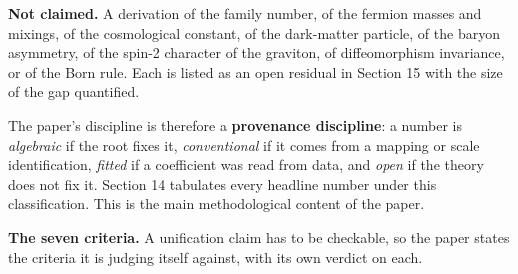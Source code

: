 \documentclass[aps,prd,twocolumn,amsmath,amssymb,superscriptaddress,nofootinbib,floatfix]{revtex4-2}
\begin{document}
\textbf{Not claimed.} A derivation of the family number, of the fermion
masses and mixings, of the cosmological constant, of the dark-matter
particle, of the baryon asymmetry, of the spin-2 character of the
graviton, of diffeomorphism invariance, or of the Born rule. Each is
listed as an open residual in Section 15 with the size of the gap
quantified.

The paper's discipline is therefore a \textbf{provenance discipline}: a
number is \emph{algebraic} if the root fixes it, \emph{conventional} if
it comes from a mapping or scale identification, \emph{fitted} if a
coefficient was read from data, and \emph{open} if the theory does not
fix it. Section 14 tabulates every headline number under this
classification. This is the main methodological content of the paper.

\textbf{The seven criteria.} A unification claim has to be checkable, so
the paper states the criteria it is judging itself against, with its own
verdict on each.
\end{document}

